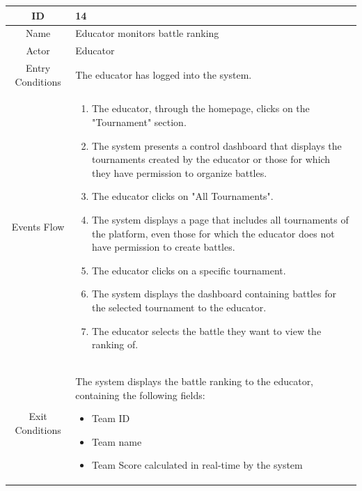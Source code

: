 \begin{longtable}{|c| p{10cm}|}
    \hline
        ID & 14 \\
    \hline
        Name & Educator monitors battle ranking \\
    \hline
        Actor & Educator \\
    \hline
        Entry Conditions & 

                The educator has logged into the system.
\\
    \hline
        Events Flow &   \begin{enumerate}
                            \item The educator, through the homepage, clicks on the "Tournament" section.
                            \item The system presents a control dashboard that displays the tournaments created by the educator or those for which they have permission to organize battles.
                            \item The educator clicks on "All Tournaments".
                            \item The system displays a page that includes all tournaments of the platform, even those for which the educator does not have permission to create battles.
                            \item The educator clicks on a specific tournament.
                            \item The system displays the dashboard containing battles for the selected tournament to the educator.
                            \item The educator selects the battle they want to view the ranking of.
                        \end{enumerate} \\
    \hline
        Exit Conditions &

            The system displays the battle ranking to the educator, containing the following fields:
            \begin{itemize}
                                \item Team ID
                                \item Team name
                                \item Team Score calculated in real-time by the system
                            \end{itemize}
\\
    \hline
\end{longtable}

